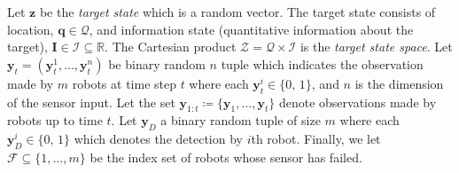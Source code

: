\documentclass[letterpaper, 10 pt, conference]{ieeeconf}
\newcommand{\Ram}[1]{{\normalsize{\textbf{({\color{green}Ram:\ }#1)}}}}
\begin{document}
Let $\bm{z}$ be the \emph{target state} which is a random vector. 
The target state consists of location, $\bm{q} \in \mathcal{Q}$, and information state (quantitative information about the target), $\bm{I} \in \mathcal{I} \subseteq \mathbb{R}$.
The Cartesian product $\mathcal{Z} = \mathcal{Q} \times \mathcal{I}$ is the \emph{target state space}.
Let $\bm{y}_{t}=(\bm{y}_{t}^{1},\dots,\bm{y}_{t}^{n})$ be binary random $n$ tuple which indicates the observation made by $m$ robots at time step $t$ where each $\bm{y}_{t}^{i} \in \lbrace 0,\,1 \rbrace$, and $n$ is the dimension of the sensor input.
Let the set $\bm{y}_{1:t}\coloneqq \lbrace \bm{y}_1,\dots,\bm{y}_t \rbrace$ denote observations made by robots up to time $t$. Let $\bm{y}_{D}$ a binary random tuple of size $m$ where each $\bm{y}_{D}^i \in \lbrace 0,\,1 \rbrace$ which denotes the detection by $i$th robot.
Finally, we let $\mathcal{F} \subseteq \lbrace 1,\dots,m \rbrace$ be the index set of robots whose sensor has failed.

\end{document}
